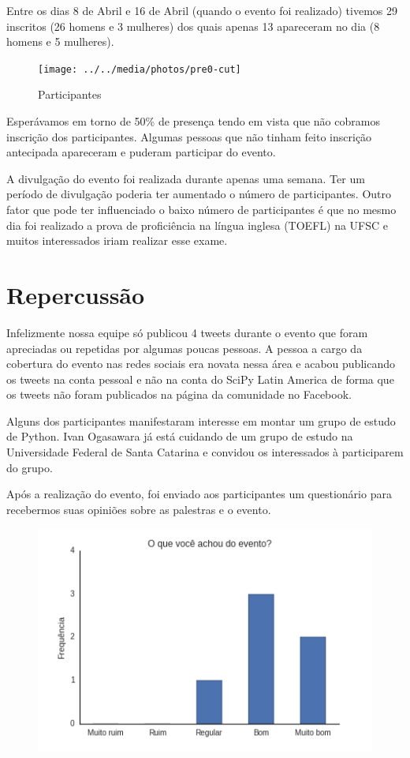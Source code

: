 \documentclass[12pt]{article}
\begin{document}
Entre os dias 8 de Abril e 16 de Abril (quando o evento foi realizado)
tivemos 29 inscritos (26 homens e 3 mulheres) dos quais apenas 13 apareceram no
dia (8 homens e 5 mulheres).

\begin{figure}[!htb]
\texttt{[image: ../../media/photos/pre0-cut]}
\caption{Participantes}
\end{figure}

Esperávamos em torno de 50\% de presença tendo em vista que não cobramos
inscrição dos participantes.
Algumas pessoas que não tinham feito inscrição antecipada apareceram e puderam
participar do evento.

A divulgação do evento foi realizada durante apenas uma semana.
Ter um período de divulgação poderia ter aumentado o número de participantes.
Outro fator que pode ter influenciado o baixo número de participantes é que no
mesmo dia foi realizado a prova de proficiência na língua inglesa
(TOEFL) na UFSC e muitos interessados iriam realizar esse exame.
\newpage

\section*{Repercussão}

Infelizmente nossa equipe só publicou 4 tweets durante o evento que foram
apreciadas ou repetidas por algumas poucas pessoas.
A pessoa a cargo da cobertura do evento nas redes sociais era novata nessa área
e acabou publicando os tweets na conta pessoal e não na conta do SciPy Latin
America de forma que os tweets não foram publicados na página da comunidade no
Facebook.

Alguns dos participantes manifestaram interesse em montar um grupo de estudo de Python. Ivan
Ogasawara já está cuidando de um grupo de estudo na Universidade Federal de Santa Catarina e
convidou os interessados à participarem do grupo.

Após a realização do evento, foi enviado aos participantes um questionário para recebermos suas
opiniões sobre as palestras e o evento.

\begin{figure}[!h]
    \centering
    \includegraphics[height=0.25\textheight]{images/evento1.png}
\end{figure}
\end{document}
